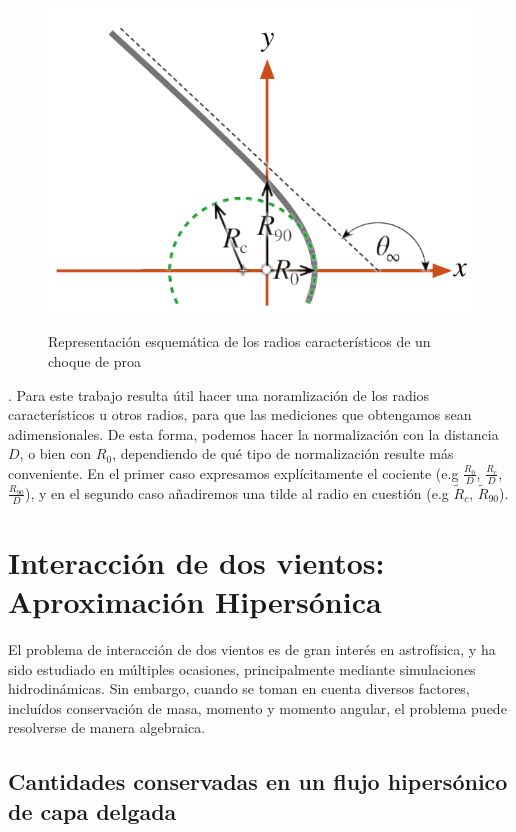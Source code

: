 \begin{figure}
  \includegraphics[width=\linewidth]{./Figures/characteristic-radii}
  \label{fig:char-radii}
  \caption{Representación esquemática de los radios característicos
  de un choque de proa}
\end{figure}.
Para este trabajo resulta útil hacer una noramlización de los radios
característicos u otros radios, para que las mediciones que obtengamos
sean adimensionales. De esta forma, podemos hacer la normalización con
la distancia $D$, o bien con $R_0$, dependiendo de qué tipo de
normalización resulte más conveniente. En el primer caso expresamos
explícitamente el cociente (e.g $\frac{R_0}{D}$, $\frac{R_c}{D}$,
$\frac{R_{90}}{D}$), y en el segundo caso añadiremos una tilde al
radio en cuestión (e.g $\tilde{R}_c$, $\tilde{R}_{90}$). 

\section[Aproximación Hipersónica]{Interacción de dos vientos: Aproximación Hipersónica \citep{Canto:1996}}
\label{sec:hipersonica}

El problema de interacción de dos vientos es de gran interés en astrofísica, y
ha sido estudiado en múltiples ocasiones, principalmente mediante simulaciones
hidrodinámicas. Sin embargo, cuando se toman en cuenta diversos factores, incluídos
conservación de masa, momento y momento angular, el problema puede resolverse de manera
algebraica.
\subsection{Cantidades conservadas en un flujo hipersónico de capa delgada}

